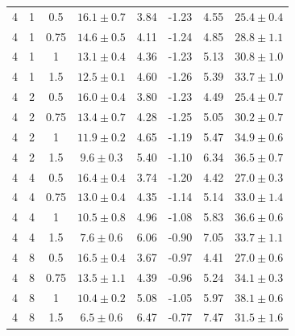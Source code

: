\documentclass{article}
\begin{document}
\begin{table}[!htbp]
\begin{tabular}{cccccccc}
4 & 1 & 0.5 & $16.1\pm0.7$ & 3.84 & -1.23 & 4.55 & $25.4\pm0.4$\\
4 & 1 & 0.75 & $14.6\pm0.5$ & 4.11 & -1.24 & 4.85 & $28.8\pm1.1$\\
4 & 1 & 1 & $13.1\pm0.4$ & 4.36 & -1.23 & 5.13 & $30.8\pm1.0$\\
4 & 1 & 1.5 & $12.5\pm0.1$ & 4.60 & -1.26 & 5.39 & $33.7\pm1.0$\\
4 & 2 & 0.5 & $16.0\pm0.4$ & 3.80 & -1.23 & 4.49 & $25.4\pm0.7$\\
4 & 2 & 0.75 & $13.4\pm0.7$ & 4.28 & -1.25 & 5.05 & $30.2\pm0.7$\\
4 & 2 & 1 & $11.9\pm0.2$ & 4.65 & -1.19 & 5.47 & $34.9\pm0.6$\\
4 & 2 & 1.5 & $9.6\pm0.3$ & 5.40 & -1.10 & 6.34 & $36.5\pm0.7$\\
4 & 4 & 0.5 & $16.4\pm0.4$ & 3.74 & -1.20 & 4.42 & $27.0\pm0.3$\\
4 & 4 & 0.75 & $13.0\pm0.4$ & 4.35 & -1.14 & 5.14 & $33.0\pm1.4$\\
4 & 4 & 1 & $10.5\pm0.8$ & 4.96 & -1.08 & 5.83 & $36.6\pm0.6$\\
4 & 4 & 1.5 & $7.6\pm0.6$ & 6.06 & -0.90 & 7.05 & $33.7\pm1.1$\\
4 & 8 & 0.5 & $16.5\pm0.4$ & 3.67 & -0.97 & 4.41 & $27.0\pm0.6$\\
4 & 8 & 0.75 & $13.5\pm1.1$ & 4.39 & -0.96 & 5.24 & $34.1\pm0.3$\\
4 & 8 & 1 & $10.4\pm0.2$ & 5.08 & -1.05 & 5.97 & $38.1\pm0.6$\\
4 & 8 & 1.5 & $6.5\pm0.6$ & 6.47 & -0.77 & 7.47 & $31.5\pm1.6$\\
\bottomrule
\end{tabular}
\end{table}
\clearpage
\end{document}
